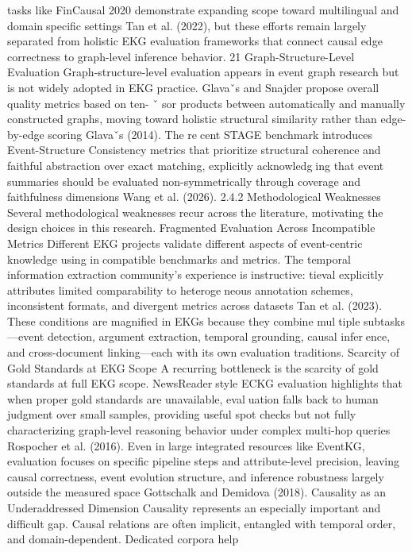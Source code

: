 tasks like FinCausal 2020 demonstrate expanding scope toward multilingual and domainspecific settings Tan et al. (2022), but these efforts remain largely separated from holistic
EKG evaluation frameworks that connect causal edge correctness to graph-level inference
behavior.
21
Graph-Structure-Level Evaluation
Graph-structure-level evaluation appears in event graph research but is not widely adopted
in EKG practice. Glavaˇs and Snajder propose overall quality metrics based on ten- ˇ
sor products between automatically and manually constructed graphs, moving toward
holistic structural similarity rather than edge-by-edge scoring Glavaˇs (2014). The recent STAGE benchmark introduces Event-Structure Consistency metrics that prioritize
structural coherence and faithful abstraction over exact matching, explicitly acknowledging that event summaries should be evaluated non-symmetrically through coverage and
faithfulness dimensions Wang et al. (2026).
2.4.2 Methodological Weaknesses
Several methodological weaknesses recur across the literature, motivating the design
choices in this research.
Fragmented Evaluation Across Incompatible Metrics
Different EKG projects validate different aspects of event-centric knowledge using incompatible benchmarks and metrics. The temporal information extraction community’s
experience is instructive: tieval explicitly attributes limited comparability to heterogeneous annotation schemes, inconsistent formats, and divergent metrics across datasets
Tan et al. (2023). These conditions are magnified in EKGs because they combine multiple subtasks—event detection, argument extraction, temporal grounding, causal inference, and cross-document linking—each with its own evaluation traditions.
Scarcity of Gold Standards at EKG Scope
A recurring bottleneck is the scarcity of gold standards at full EKG scope. NewsReaderstyle ECKG evaluation highlights that when proper gold standards are unavailable, evaluation falls back to human judgment over small samples, providing useful spot checks but
not fully characterizing graph-level reasoning behavior under complex multi-hop queries
Rospocher et al. (2016). Even in large integrated resources like EventKG, evaluation
focuses on specific pipeline steps and attribute-level precision, leaving causal correctness,
event evolution structure, and inference robustness largely outside the measured space
Gottschalk and Demidova (2018).
Causality as an Underaddressed Dimension
Causality represents an especially important and difficult gap. Causal relations are often
implicit, entangled with temporal order, and domain-dependent. Dedicated corpora help
